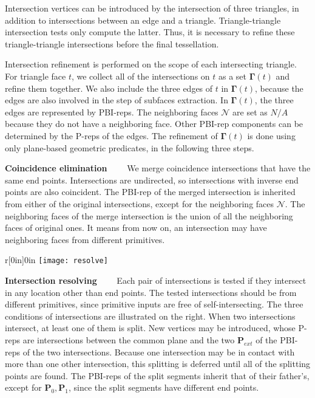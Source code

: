 \label{sec:refine}

Intersection vertices can be introduced by the intersection of three triangles, in addition to intersections between an edge and a triangle. Triangle-triangle intersection tests only compute the latter. Thus, it is necessary to refine these triangle-triangle intersections before the final tessellation.

Intersection refinement is performed on the scope of each intersecting triangle. For triangle face $t$, we collect all of the intersections on $t$ as a set $\bm{\Gamma}(t)$ and refine them together. We also include the three edges of $t$ in $\bm{\Gamma}(t)$, because the edges are also involved in the step of subfaces extraction. In $\bm{\Gamma}(t)$, the three edges are represented by PBI-reps. The neighboring faces $\mathcal{N}$ are set as $N/A$ because they do not have a neighboring face. Other PBI-rep components can be determined by the P-reps of the edges. The refinement of $\bm{\Gamma}(t)$ is done using only plane-based geometric predicates, in the following three steps.


\vspace{0.5em}
\noindent \textbf{Coincidence elimination}~~~~
We merge coincidence intersections that have the same end points. Intersections are undirected, so intersections with inverse end points are also coincident. The PBI-rep of the merged intersection is inherited from either of the original intersections, except for the neighboring faces $\mathcal{N}$. The neighboring faces of the merge intersection is the union of all the neighboring faces of original ones. It means from now on, an intersection may have neighboring faces from different primitives.

\vspace{0.5em}
\begin{wrapfigure}{r}[0in]{0in}
\texttt{[image: resolve]}
\end{wrapfigure}
\noindent\textbf{Intersection resolving}~~~~
Each pair of intersections is tested if they intersect in any location other than end points. The tested intersections should be from different primitives, since primitive inputs are free of self-intersecting. The three conditions of intersections are illustrated on the right. When two intersections intersect, at least one of them is split. New vertices may be introduced, whose P-reps are intersections between the common plane and the two $\bm{P}_{ext}$ of the PBI-reps of the two intersections. Because one intersection may be in contact with more than one other intersection, this splitting is deferred until all of the splitting points are found. The PBI-reps of the split segments inherit that of their father's, except for $\bm{P}_0, \bm{P}_1$, since the split segments have different end points.

